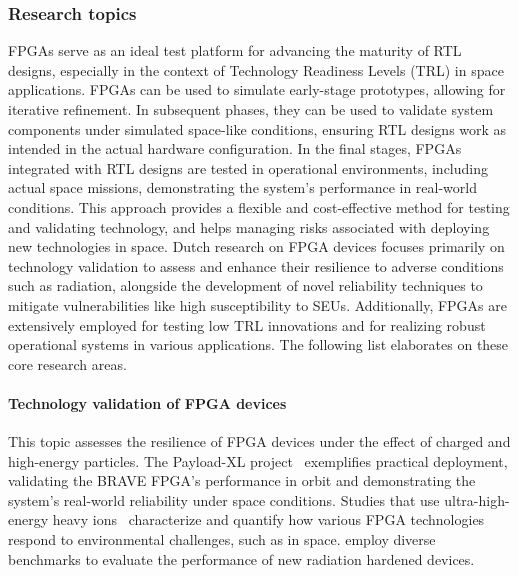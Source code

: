 


\subsubsection*{\bf{Research topics}}

FPGAs serve as an ideal test platform for advancing the maturity of RTL designs, especially in the context of Technology Readiness Levels (TRL) in space applications. %
FPGAs can be 
used to simulate early-stage prototypes, allowing for iterative refinement. In subsequent phases, they can be used to %
validate system components under simulated space-like conditions, ensuring RTL designs work as intended in the actual hardware configuration. In the final stages, FPGAs integrated with RTL designs are tested in operational environments, including actual space missions, demonstrating the system’s performance in real-world conditions. This approach %
provides a flexible and cost-effective method for testing and validating technology, and %
helps managing %
risks associated with deploying new technologies in space. Dutch research on FPGA devices focuses primarily on technology validation to assess and enhance their resilience to adverse conditions such as radiation, alongside the development of novel reliability techniques to mitigate vulnerabilities like high susceptibility to SEUs. Additionally, FPGAs are extensively employed for %
testing 
low TRL %
innovations and for realizing robust operational systems in various applications. The following list elaborates on these core research areas.


    \paragraph{Technology validation of FPGA devices}
    This topic assesses the resilience of FPGA devices under the effect of charged and high-energy particles. The Payload-XL project~\cite{Viel2023Payload-XL:FPGA} exemplifies practical deployment, validating the BRAVE FPGA's performance in orbit and demonstrating the system's real-world reliability under space conditions. %
    Studies that %
    use ultra-high-energy heavy ions~\cite{Vlagkoulis2021SingleIons,Du2019UltrahighFPGA} characterize and quantify how various FPGA technologies respond to environmental challenges, such as in space. \citet{Leon2021DevelopmentBenchmarks} employ %
    diverse benchmarks to evaluate the performance of new radiation hardened devices. %
    
